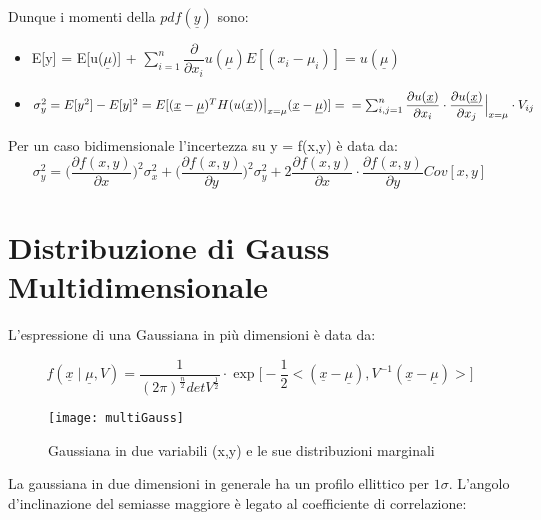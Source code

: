 \noindent Dunque i momenti della $pdf(\underline{y})$ sono:

\begin{itemize}
	\item E[y] = E[u($\underline{\mu}$)] + $\sum_{i =1}^{n} \dfrac{\partial}{\partial x_{i}}u(\underline{\mu})E[(x_i - \mu_{i})] = u(\underline{\mu}) $
	\item $\sigma_y^2 = E[y^2] - E[y]^2 = E[ (\underline{x} - \underline{\mu})^T H(u(\underline{x}))\big \vert_{x = \mu}(\underline{x} - \underline{\mu})] = \\ \\ =\sum_{i,j =1}^n \dfrac{\partial u(\underline{x})}{\partial x_i} \cdot \dfrac{\partial u(\underline{x})}{\partial x_j}\Big \vert_{x = \mu} \cdot V_{ij}$
\end{itemize}
\vspace{0.1in}
\noindent Per un caso bidimensionale l'incertezza su y = f(x,y) \`{e} data da:
\vspace{0.05in}
\begin{equation}
	\sigma_{y}^2 = \Big (\dfrac{\partial f(x,y)}{\partial x}\Big)^2  \sigma_x^2 + \Big (\dfrac{\partial f(x,y)}{\partial y}\Big)^2  \sigma_y^2 + 2 \dfrac{\partial f(x,y)}{\partial x} \cdot \dfrac{\partial f(x,y)}{\partial y} Cov[x,y]
\end{equation}
\newpage

\section{Distribuzione di Gauss Multidimensionale}


L'espressione di una Gaussiana in pi\`{u} dimensioni \`{e} data da:

\begin{equation}
	f(\underline{x} \; \big \vert \;  \underline{\mu},V) = \dfrac{1}{(2 \pi)^{\frac{n}{2}}detV^{\frac{1}{2}}} \cdot \exp{\Big [-\frac{1}{2} <(\underline{x} - \underline{\mu}),V^{-1}(\underline{x} - \underline{\mu})> \Big ]}
	\end{equation}
	
	
 
\begin{figure}[ht]
\vspace{0.1in}
\texttt{[image: multiGauss]}	
\centering
\vspace{0.1in}
\caption{Gaussiana in due variabili (x,y) e le sue distribuzioni marginali}
\end{figure}

\noindent La gaussiana in due dimensioni in generale ha un profilo ellittico per $1\sigma$. L'angolo d'inclinazione del semiasse maggiore \`{e} legato al coefficiente di correlazione:


